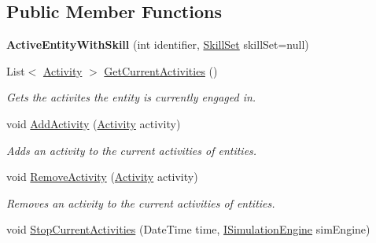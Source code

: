 \subsection*{Public Member Functions}
\begin{DoxyCompactItemize}
\item 
{\bfseries Active\+Entity\+With\+Skill} (int identifier, \hyperlink{class_simulation_core_1_1_h_c_c_m_elements_1_1_skill_set}{Skill\+Set} skill\+Set=null)\hypertarget{class_simulation_core_1_1_h_c_c_m_elements_1_1_active_entity_with_skill_a537a1504fba6ecb486d705aa7b0a9f07}{}\label{class_simulation_core_1_1_h_c_c_m_elements_1_1_active_entity_with_skill_a537a1504fba6ecb486d705aa7b0a9f07}

\item 
List$<$ \hyperlink{class_simulation_core_1_1_h_c_c_m_elements_1_1_activity}{Activity} $>$ \hyperlink{class_simulation_core_1_1_h_c_c_m_elements_1_1_active_entity_with_skill_a6f0a4928471348a860668538e968360f}{Get\+Current\+Activities} ()
\begin{DoxyCompactList}\small\item\em Gets the activites the entity is currently engaged in. \end{DoxyCompactList}\item 
void \hyperlink{class_simulation_core_1_1_h_c_c_m_elements_1_1_active_entity_with_skill_a10d31648f401813e6bf6a9e56ac343b9}{Add\+Activity} (\hyperlink{class_simulation_core_1_1_h_c_c_m_elements_1_1_activity}{Activity} activity)
\begin{DoxyCompactList}\small\item\em Adds an activity to the current activities of entities. \end{DoxyCompactList}\item 
void \hyperlink{class_simulation_core_1_1_h_c_c_m_elements_1_1_active_entity_with_skill_a2e694309b6d1f088681ad79f8abd0da1}{Remove\+Activity} (\hyperlink{class_simulation_core_1_1_h_c_c_m_elements_1_1_activity}{Activity} activity)
\begin{DoxyCompactList}\small\item\em Removes an activity to the current activities of entities. \end{DoxyCompactList}\item 
void \hyperlink{class_simulation_core_1_1_h_c_c_m_elements_1_1_active_entity_with_skill_adebf2a0cbb11d0c9c5f1d6d1d6fa13c5}{Stop\+Current\+Activities} (Date\+Time time, \hyperlink{interface_simulation_core_1_1_simulation_classes_1_1_i_simulation_engine}{I\+Simulation\+Engine} sim\+Engine)

\end{DoxyCompactItemize}
